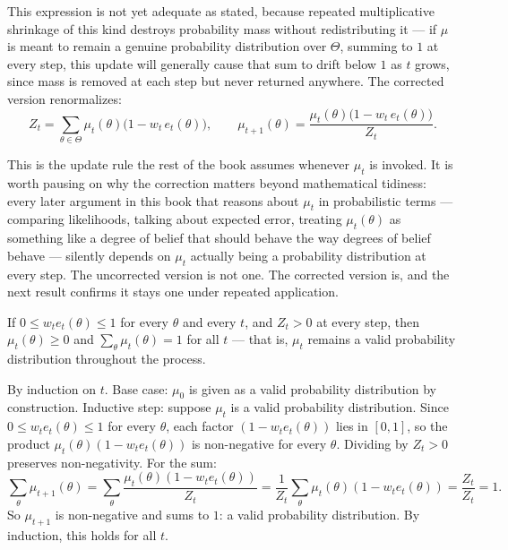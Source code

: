 This expression is not yet adequate as stated, because repeated multiplicative shrinkage of this kind destroys probability mass without redistributing it --- if $\mu$ is meant to remain a genuine probability distribution over $\Theta$, summing to $1$ at every step, this update will generally cause that sum to drift below $1$ as $t$ grows, since mass is removed at each step but never returned anywhere. The corrected version renormalizes:
\[
Z_t = \sum_{\theta \in \Theta} \mu_t(\theta)\bigl(1 - w_t\, e_t(\theta)\bigr), \qquad
\mu_{t+1}(\theta) = \frac{\mu_t(\theta)\bigl(1 - w_t\, e_t(\theta)\bigr)}{Z_t}.
\]

This is the update rule the rest of the book assumes whenever $\mu_t$ is invoked. It is worth pausing on why the correction matters beyond mathematical tidiness: every later argument in this book that reasons about $\mu_t$ in probabilistic terms --- comparing likelihoods, talking about expected error, treating $\mu_t(\theta)$ as something like a degree of belief that should behave the way degrees of belief behave --- silently depends on $\mu_t$ actually being a probability distribution at every step. The uncorrected version is not one. The corrected version is, and the next result confirms it stays one under repeated application.

\begin{theorem}
\label{thm:stability}
If $0 \leq w_t e_t(\theta) \leq 1$ for every $\theta$ and every $t$, and $Z_t > 0$ at every step, then $\mu_t(\theta) \geq 0$ and $\sum_\theta \mu_t(\theta) = 1$ for all $t$ --- that is, $\mu_t$ remains a valid probability distribution throughout the process.
\end{theorem}

\begin{proofsketch}
By induction on $t$. Base case: $\mu_0$ is given as a valid probability distribution by construction. Inductive step: suppose $\mu_t$ is a valid probability distribution. Since $0 \leq w_t e_t(\theta) \leq 1$ for every $\theta$, each factor $(1 - w_t e_t(\theta))$ lies in $[0,1]$, so the product $\mu_t(\theta)(1 - w_t e_t(\theta))$ is non-negative for every $\theta$. Dividing by $Z_t > 0$ preserves non-negativity. For the sum:
\[
\sum_\theta \mu_{t+1}(\theta) = \sum_\theta \frac{\mu_t(\theta)(1 - w_t e_t(\theta))}{Z_t} = \frac{1}{Z_t}\sum_\theta \mu_t(\theta)(1 - w_t e_t(\theta)) = \frac{Z_t}{Z_t} = 1.
\]
So $\mu_{t+1}$ is non-negative and sums to $1$: a valid probability distribution. By induction, this holds for all $t$. \qedhere
\end{proofsketch}


